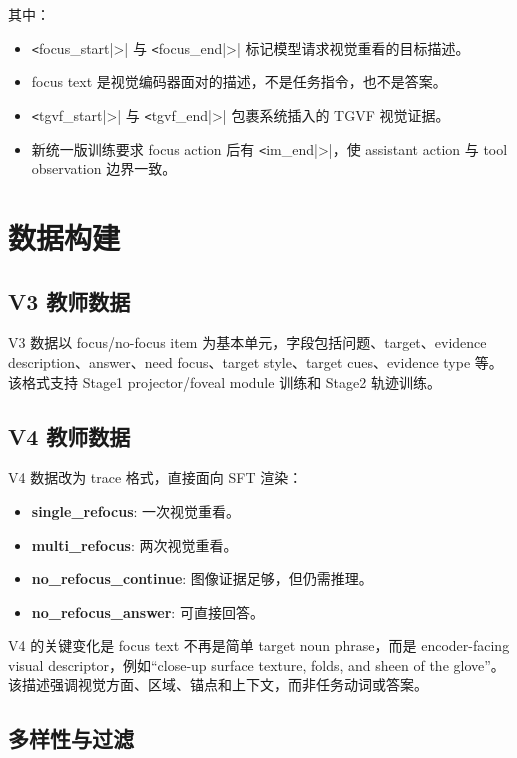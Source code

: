 \documentclass[10pt,twocolumn]{ctexart}
\begin{document}
其中：

\begin{itemize}
  \item \verb|<|focus_start|>| 与 \verb|<|focus_end|>| 标记模型请求视觉重看的目标描述。
  \item focus text 是视觉编码器面对的描述，不是任务指令，也不是答案。
  \item \verb|<|tgvf_start|>| 与 \verb|<|tgvf_end|>| 包裹系统插入的 TGVF 视觉证据。
  \item 新统一版训练要求 focus action 后有 \verb|<|im_end|>|，使 assistant action 与 tool observation 边界一致。
\end{itemize}

\section{数据构建}

\subsection{V3 教师数据}

V3 数据以 focus/no-focus item 为基本单元，字段包括问题、target、evidence description、answer、need focus、target style、target cues、evidence type 等。该格式支持 Stage1 projector/foveal module 训练和 Stage2 轨迹训练。

\subsection{V4 教师数据}

V4 数据改为 trace 格式，直接面向 SFT 渲染：

\begin{itemize}
  \item \textbf{single\_refocus}: 一次视觉重看。
  \item \textbf{multi\_refocus}: 两次视觉重看。
  \item \textbf{no\_refocus\_continue}: 图像证据足够，但仍需推理。
  \item \textbf{no\_refocus\_answer}: 可直接回答。
\end{itemize}

V4 的关键变化是 focus text 不再是简单 target noun phrase，而是 encoder-facing visual descriptor，例如“close-up surface texture, folds, and sheen of the glove”。该描述强调视觉方面、区域、锚点和上下文，而非任务动词或答案。

\subsection{多样性与过滤}
\end{document}
